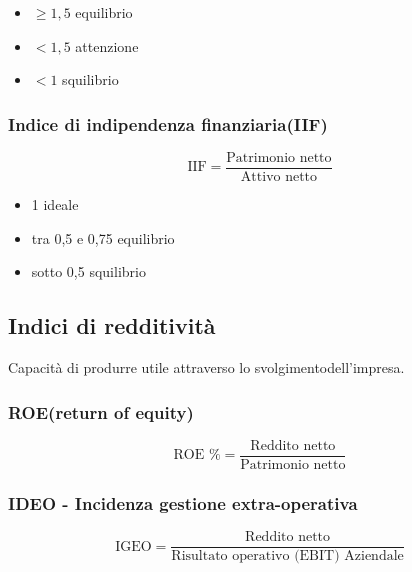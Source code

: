 \begin{itemize}
    \item $\geq 1,5$ equilibrio
    \item $< 1,5$ attenzione
    \item $< 1$ squilibrio
\end{itemize}

\subsubsection{Indice di indipendenza finanziaria(IIF)}
\begin{equation*}
    \text{IIF} = \frac{\text{Patrimonio netto}}{\text{Attivo netto}}
\end{equation*}

\begin{itemize}
    \item 1 ideale
    \item tra 0,5 e 0,75 equilibrio
    \item sotto 0,5 squilibrio
\end{itemize}

\subsection{Indici di redditività}
Capacità di produrre utile attraverso lo svolgimentodell'impresa.

\subsubsection{ROE(return of equity)}
\begin{equation*}
    \text{ROE \%} = \frac{\text{Reddito netto}}{\text{Patrimonio netto}}
\end{equation*}

\subsubsection{IDEO - Incidenza gestione extra-operativa}
\begin{equation*}
    \text{IGEO} = \frac{\text{Reddito netto}}{\text{Risultato operativo (EBIT) Aziendale}}
\end{equation*}

